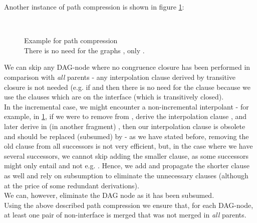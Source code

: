 Another instance of path compression is shown in figure \ref{example_4.2.1.8}:
\begin{figure}[H]
\\
\caption{Example for path compression\\
There is no need for the graphs , only .
}
\label{example_4.2.1.8}
\end{figure}
\noindent
We can skip any DAG-node where no congruence closure has been performed in comparison with \emph{all} parents - any interpolation clause derived by transitive closure is not needed (e.g. if  and  then there is no need for the clause  because we use the clauses  which are on the interface (which is transitively closed).\\
In the incremental case, we might encounter a non-incremental interpolant - for example, in \ref{example_4.2.1.8}, 
if we were to remove  from , derive the interpolation clause ,
and later derive in  (in another fragment) , then our interpolation clause is obsolete and should be replaced (subsumed) by  - as we have stated before, 
removing the old clause from all successors is not very efficient, but, in the case where we have several successors,
we cannot skip adding the smaller clause, as some successors might only entail  and not  e.g. .
Hence, we add and propagate the shorter clause as well and rely on subsumption to eliminate the unnecessary clauses 
(although at the price of some redundant derivations). \\
We can, however, eliminate the DAG node  as it has been subsumed.\\
Using the above described path compression we ensure that, for each DAG-node, 
at least one pair of non-interface \GFAs{} is merged that was not merged in \emph{all} parents.

